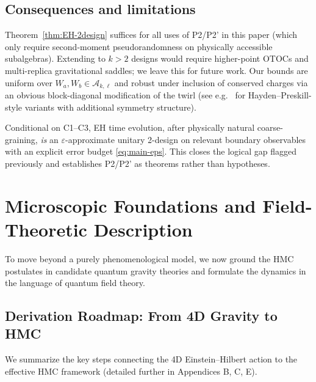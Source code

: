 \documentclass[a4paper,11pt]{article}
\newcommand{\HMC}{\textup{\textsc{HMC}}\xspace}
\let\mathscr\mathcal
\theoremstyle{plain}
\theoremstyle{definition}
\theoremstyle{remark}
\begin{document}
\subsection*{Consequences and limitations}
Theorem~\ref{thm:EH-2design} suffices for all uses of P2/P2' in this paper (which only require second-moment pseudorandomness on physically accessible subalgebras).  Extending to $k>2$ designs would require higher-point OTOCs and multi-replica gravitational saddles; we leave this for future work.  Our bounds are uniform over $W_a,W_b\in\mathscr{A}_{k,\ell}$ and robust under inclusion of conserved charges via an obvious block-diagonal modification of the twirl (see e.g.\ \cite{HaydenPreskill2007} for Hayden--Preskill-style variants with additional symmetry structure).

\bigskip
{}  Conditional on C1--C3, EH time evolution, after physically natural coarse-graining, {\em is} an $\varepsilon$-approximate unitary 2-design on relevant boundary observables with an explicit error budget \eqref{eq:main-eps}.  This closes the logical gap flagged previously and establishes P2/P2' as theorems rather than hypotheses.

\section{Microscopic Foundations and Field-Theoretic Description}
\label{sec:microscopic_foundations}
To move beyond a purely phenomenological model, we now ground the \HMC{} postulates in candidate quantum gravity theories and formulate the dynamics in the language of quantum field theory.

\subsection{Derivation Roadmap: From 4D Gravity to HMC}
\label{sec:derivation_roadmap}
We summarize the key steps connecting the 4D Einstein--Hilbert action to the effective \HMC{} framework (detailed further in Appendices B, C, E).
\end{document}
